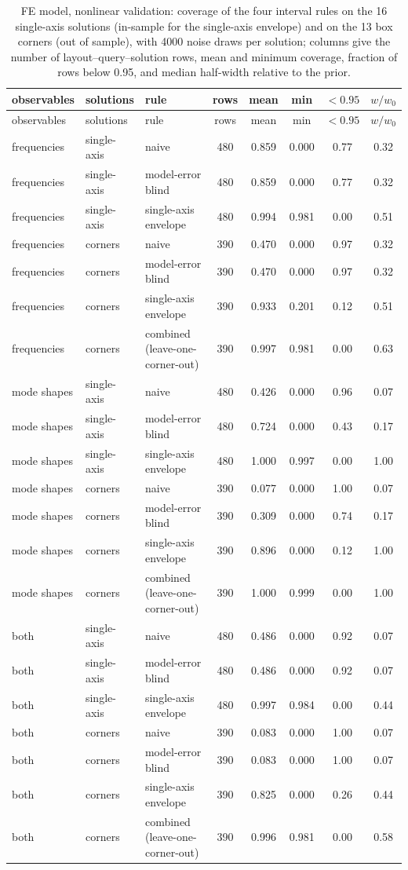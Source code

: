 {\footnotesize
\begin{longtable}{lllccccc}
\caption{FE model, nonlinear validation: coverage of the four interval rules on the 16 single-axis solutions (in-sample for the single-axis envelope) and on the 13 box corners (out of sample), with 4000 noise draws per solution; columns give the number of layout--query--solution rows, mean and minimum coverage, fraction of rows below 0.95, and median half-width relative to the prior.}\label{tab:s9}\\
\toprule observables & solutions & rule & rows & mean & min & $<0.95$ & $w/w_0$\\ \midrule\endfirsthead
\toprule observables & solutions & rule & rows & mean & min & $<0.95$ & $w/w_0$\\ \midrule\endhead
frequencies & single-axis & naive & 480 & 0.859 & 0.000 & 0.77 & 0.32 \\
frequencies & single-axis & model-error blind & 480 & 0.859 & 0.000 & 0.77 & 0.32 \\
frequencies & single-axis & single-axis envelope & 480 & 0.994 & 0.981 & 0.00 & 0.51 \\
frequencies & corners & naive & 390 & 0.470 & 0.000 & 0.97 & 0.32 \\
frequencies & corners & model-error blind & 390 & 0.470 & 0.000 & 0.97 & 0.32 \\
frequencies & corners & single-axis envelope & 390 & 0.933 & 0.201 & 0.12 & 0.51 \\
frequencies & corners & combined (leave-one-corner-out) & 390 & 0.997 & 0.981 & 0.00 & 0.63 \\
mode shapes & single-axis & naive & 480 & 0.426 & 0.000 & 0.96 & 0.07 \\
mode shapes & single-axis & model-error blind & 480 & 0.724 & 0.000 & 0.43 & 0.17 \\
mode shapes & single-axis & single-axis envelope & 480 & 1.000 & 0.997 & 0.00 & 1.00 \\
mode shapes & corners & naive & 390 & 0.077 & 0.000 & 1.00 & 0.07 \\
mode shapes & corners & model-error blind & 390 & 0.309 & 0.000 & 0.74 & 0.17 \\
mode shapes & corners & single-axis envelope & 390 & 0.896 & 0.000 & 0.12 & 1.00 \\
mode shapes & corners & combined (leave-one-corner-out) & 390 & 1.000 & 0.999 & 0.00 & 1.00 \\
both & single-axis & naive & 480 & 0.486 & 0.000 & 0.92 & 0.07 \\
both & single-axis & model-error blind & 480 & 0.486 & 0.000 & 0.92 & 0.07 \\
both & single-axis & single-axis envelope & 480 & 0.997 & 0.984 & 0.00 & 0.44 \\
both & corners & naive & 390 & 0.083 & 0.000 & 1.00 & 0.07 \\
both & corners & model-error blind & 390 & 0.083 & 0.000 & 1.00 & 0.07 \\
both & corners & single-axis envelope & 390 & 0.825 & 0.000 & 0.26 & 0.44 \\
both & corners & combined (leave-one-corner-out) & 390 & 0.996 & 0.981 & 0.00 & 0.58 \\
\bottomrule
\end{longtable}
}
